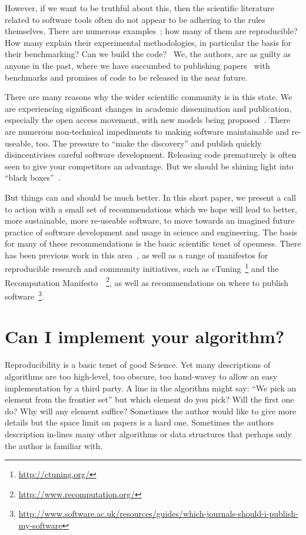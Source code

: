 \documentclass[conference]{IEEEtran}
\begin{document}
However, if we want to be truthful about this, then the scientific
literature related to software tools often do not appear to be
adhering to the rules themselves. There are numerous
examples~\cite{beck-et-al:2005,prosser:2012}; how many of them are
reproducible? How many explain their experimental methodologies, in
particular the basis for their benchmarking? Can we build the
code?~\cite{collberg-et-al:2014} We, the authors, are as guilty as
anyone in the past, where we have succumbed to publishing
papers~\cite{crick-et-al:2009,Berdine2011SLAyer} with benchmarks and
promises of code to be released in the near future.

There are many reasons why the wider scientific community is in this
state. We are experiencing significant changes in academic
dissemination and publication, especially the open access movement,
with new models being
proposed~\cite{stodden-et-al:2013,fursin+dubach:2014}.  There are
numerous non-technical impediments to making software maintainable and
re-useable, too. The pressure to ``make the discovery'' and publish
quickly disincentivises careful software development. Releasing
code prematurely is often seen to give your competitors an
advantage. But we should be shining light into ``black
boxes''~\cite{morin-et-al:2012}.

But things can and should be much better. In this short paper, we
present a call to action with a small set of recommendations which we
hope will lead to better, more sustainable, more re-useable software,
to move towards an imagined future practice of software development
and usage in science and engineering.  The basis for many of these
recommendations is the basic scientific tenet of openness. There has
been previous work in this
area~\cite{sim-et-al:2003,chirigati-et-al:2013}, as well as a range of
manifestos for reproducible research and community initiatives, such
as cTuning~\footnote{\url{http://ctuning.org/}} and the Recomputation
Manifesto~\cite{gent:2013}~\footnote{\url{http://www.recomputation.org/}},
as well as recommendations on where to publish
software~\footnote{\url{http://www.software.ac.uk/resources/guides/which-journals-should-i-publish-my-software}}.


\section{Can I implement your algorithm?}

Reproducibility is a basic tenet of good Science. Yet many
descriptions of algorithms are too high-level, too obscure, too
hand-wavey to allow an easy implementation by a third party. A line in
the algorithm might say: ``We pick an element from the frontier set''
but which element do you pick? Will the first one do? Why will any
element suffice? Sometimes the author would like to give more details
but the space limit on papers is a hard one. Sometimes the authors
description in-lines many other algorithms or data structures that
perhaps only the author is familiar with.
\end{document}
